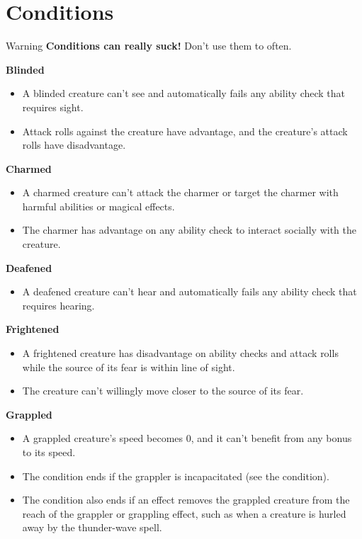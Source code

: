 \documentclass[a4paper,10pt,twoside,twocolumn]{dndbook} %
\begin{document}
	\section{Conditions}
	\begingroup
	\DndSetThemeColor[DmgCoral]
	\begin{DndSidebar}{Warning}
		\textbf{Conditions can really suck!}\linebreak
		Don't use them to often.
	\end{DndSidebar}
	\endgroup
	\begin{DndSidebar}{}
		\textbf{Blinded}
		\begin{itemize}
			\item A blinded creature can't see and automatically fails any ability check that requires sight.
			\item Attack rolls against the creature have advantage, and the creature's attack rolls have disadvantage. 
		\end{itemize}
	\textbf{Charmed}
	\begin{itemize}
		\item A charmed creature can't attack the charmer or target the charmer with harmful abilities or magical effects.
		\item The charmer has advantage on any ability check to interact socially with the creature.
	\end{itemize}
	\textbf{Deafened}
	\begin{itemize}
		\item A deafened creature can't hear and automatically fails any ability check that requires hearing.
	\end{itemize}
	\textbf{Frightened}
	\begin{itemize}
		\item A frightened creature has disadvantage on ability checks and attack rolls while the source of its fear is within line of sight.
		\item The creature can't willingly move closer to the source of its fear.
	\end{itemize}
	\textbf{Grappled}
	\begin{itemize}
		\item A grappled creature's speed becomes 0, and it can't benefit from any bonus to its speed.
		\item The condition ends if the grappler is incapacitated (see the condition).
		\item The condition also ends if an effect removes the grappled creature from the reach of the grappler or grappling effect, such as when a creature is hurled away by the thunder-wave spell.

\end{itemize}
\end{DndSidebar}
\end{document}
